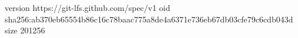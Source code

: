 version https://git-lfs.github.com/spec/v1
oid sha256:ab370eb65554b86c16c78baac775a8de4a6371e736eb67db03cfe79c6cdb043d
size 201256
